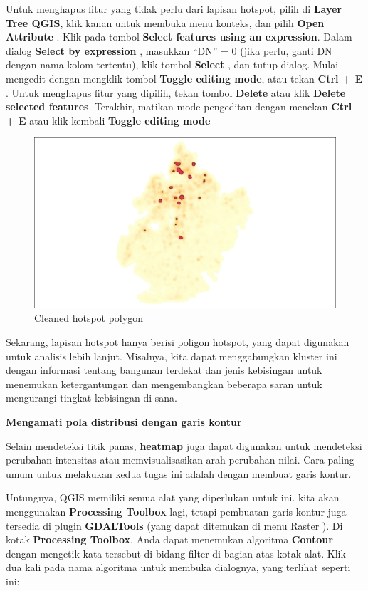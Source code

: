 \documentclass[]{book}
\begin{document}
Untuk menghapus fitur yang tidak perlu dari lapisan hotspot, pilih di \textbf{Layer Tree QGIS}, klik kanan untuk membuka menu konteks, dan pilih \textbf{Open Attribute} . Klik pada tombol \textbf{Select features using an expression}. Dalam dialog \textbf{Select by expression} , masukkan ``DN'' = 0 (jika perlu, ganti DN dengan nama kolom tertentu), klik tombol \textbf{Select} , dan tutup dialog. Mulai mengedit dengan mengklik tombol \textbf{Toggle editing mode}, atau tekan \textbf{Ctrl + E} . Untuk menghapus fitur yang dipilih, tekan tombol \textbf{Delete} atau klik \textbf{Delete selected features}. Terakhir, matikan mode pengeditan dengan menekan \textbf{Ctrl + E} atau klik kembali \textbf{Toggle editing mode}

\begin{figure}

{\centering \includegraphics[width=0.8\linewidth]{images/04/fig81} 

}

\caption{Cleaned hotspot polygon}\label{fig:fig1481}
\end{figure}

Sekarang, lapisan hotspot hanya berisi poligon hotspot, yang dapat digunakan untuk analisis lebih lanjut. Misalnya, kita dapat menggabungkan kluster ini dengan informasi tentang bangunan terdekat dan jenis kebisingan untuk menemukan ketergantungan dan mengembangkan beberapa saran untuk mengurangi tingkat kebisingan di sana.

\textbf{Mengamati pola distribusi dengan garis kontur}

Selain mendeteksi titik panas, \textbf{heatmap} juga dapat digunakan untuk mendeteksi perubahan intensitas atau memvisualisasikan arah perubahan nilai. Cara paling umum untuk melakukan kedua tugas ini adalah dengan membuat garis kontur.

Untungnya, QGIS memiliki semua alat yang diperlukan untuk ini. kita akan menggunakan \textbf{Processing Toolbox} lagi, tetapi pembuatan garis kontur juga tersedia di plugin \textbf{GDALTools} (yang dapat ditemukan di menu Raster ). Di kotak \textbf{Processing Toolbox}, Anda dapat menemukan algoritma \textbf{Contour} dengan mengetik kata tersebut di bidang filter di bagian atas kotak alat. Klik dua kali pada nama algoritma untuk membuka dialognya, yang terlihat seperti ini:
\end{document}
